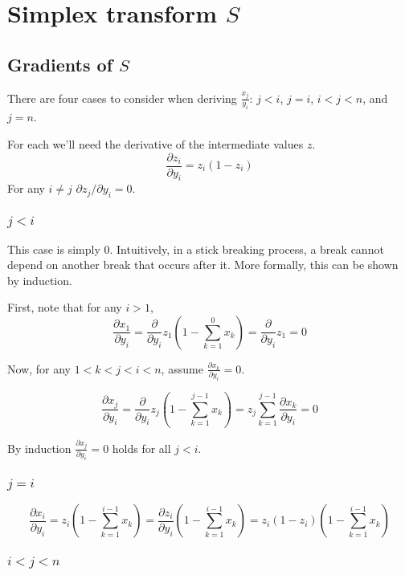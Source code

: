 \documentclass{article}
\begin{document}
\section{Simplex transform $S$}


\subsection{Gradients of $S$}


There are four cases to consider when deriving $\frac{x_j}{y_i}$: $j < i$, $j =
i$, $i < j < n$, and  $j = n$.


For each we'll need the derivative of the intermediate values $z$.
\begin{equation}
\frac{\partial z_i}{\partial y_i} = z_i (1 - z_i)
\end{equation}
For any $i \neq j$ $\partial z_j / \partial y_i = 0$.


\subsubsection{$j < i$}
This case is simply 0. Intuitively, in a stick breaking process, a break cannot
depend on another break that occurs after it. More formally, this can be shown
by induction.

First, note that for any $i > 1$,
$$\frac{\partial x_1}{\partial y_i} = \frac{\partial}{\partial
y_i} z_1 \left(1 - \sum_{k=1}^0 x_k \right) = \frac{\partial}{\partial y_i} z_1 = 0$$

Now, for any $1 < k < j < i < n$, assume $\frac{\partial x_k}{\partial y_i} = 0$.

$$\frac{\partial x_j}{\partial y_i} = \frac{\partial}{\partial y_i} z_j \left(1 -
\sum_{k=1}^{j-1} x_k \right) = z_j \sum_{k=1}^{j-1} \frac{\partial x_k}{\partial y_i} = 0
$$

By induction $\frac{\partial x_j}{\partial y_i} = 0$ holds for all $j < i$.


\subsubsection{$j = i$}

$$\frac{\partial x_i}{\partial y_i} = z_i \left( 1 - \sum_{k=1}^{i-1} x_k \right) =
\frac{\partial z_i}{\partial y_i} \left( 1 - \sum_{k=1}^{i-1} x_k \right) =
z_i (1 - z_i) \left( 1 - \sum_{k=1}^{i-1} x_k \right)$$

\subsubsection{$i < j < n$}
\end{document}
